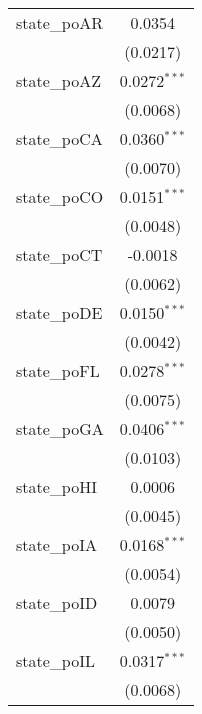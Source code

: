\begin{tabular}{lc}
   state\_poAR                                        & 0.0354\\   
                                                      & (0.0217)\\   
   state\_poAZ                                        & 0.0272$^{***}$\\   
                                                      & (0.0068)\\   
   state\_poCA                                        & 0.0360$^{***}$\\   
                                                      & (0.0070)\\   
   state\_poCO                                        & 0.0151$^{***}$\\   
                                                      & (0.0048)\\   
   state\_poCT                                        & -0.0018\\   
                                                      & (0.0062)\\   
   state\_poDE                                        & 0.0150$^{***}$\\   
                                                      & (0.0042)\\   
   state\_poFL                                        & 0.0278$^{***}$\\   
                                                      & (0.0075)\\   
   state\_poGA                                        & 0.0406$^{***}$\\   
                                                      & (0.0103)\\   
   state\_poHI                                        & 0.0006\\   
                                                      & (0.0045)\\   
   state\_poIA                                        & 0.0168$^{***}$\\   
                                                      & (0.0054)\\   
   state\_poID                                        & 0.0079\\   
                                                      & (0.0050)\\   
   state\_poIL                                        & 0.0317$^{***}$\\   
                                                      & (0.0068)\\   

\end{tabular}
